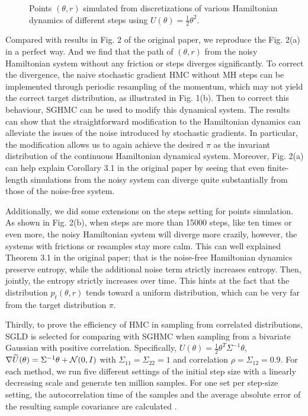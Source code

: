 \begin{figure}[htp] 
    \centering
    \hfill%
    \caption{Points $(\theta,r)$ simulated from discretizations of various Hamiltonian dynamics of different steps using $U(\theta) = \frac{1}{2}\theta^2$.}
\end{figure}



Compared with results in Fig. 2 of the original paper, we reproduce the Fig. 2(a) in a perfect way. And we find that the path of $(\theta,r)$ from the noisy Hamiltonian system without any friction or steps diverges significantly. To correct the divergence, the naive stochastic gradient HMC without MH steps can be implemented through periodic resampling of the momentum, which may not yield the correct target distribution, as illustrated in Fig. 1(b). Then to correct this behaviour, SGHMC can be used to modify this dynamical system. The results can show that the straightforward modification to the Hamiltonian dynamics can alleviate the issues of the noise introduced by stochastic gradients. In particular, the modification allows us to again achieve the desired $\pi$ as the invariant distribution of the continuous Hamiltonian dynamical system. Moreover, Fig. 2(a) can help explain Corollary 3.1 in the original paper by seeing that even finite-length simulations from the noisy system can diverge quite substantially from those of the noise-free system.

Additionally, we did some extensions on the steps setting for points simulation. As shown in Fig. 2(b), when steps are more than 15000 steps, like ten times or even more, the noisy Hamiltonian system will diverge more crazily, however, the systems with frictions or resamples stay more calm. This can well explained Theorem 3.1 in the original paper; that is the noise-free Hamiltonian dynamics preserve entropy, while the additional noise term strictly increases entropy. Then, jointly, the entropy strictly increases over time. This hints at the fact that the distribution $p_t(\theta,r)$ tends toward a uniform distribution, which can be very far from the target distribution $\pi$. 

Thirdly, to prove the efficiency of HMC in sampling from correlated distributions, SGLD \cite{sgld} is selected for comparing with SGHMC when sampling from a bivariate Gaussian with positive correlation. Specifically, $U(\theta)=\frac{1}{2}\theta^T\Sigma^{-1}\theta$, 
$\nabla \widetilde{U}(\theta) = \Sigma^{-1}\theta + \mathcal{N}(0,I)$ with $\Sigma_{11} = \Sigma_{22} = 1$ and correlation $\rho = \Sigma_{12} = 0.9$.  For each method, we run five different settings of the initial step size with a linearly decreasing scale and generate ten million samples. For one set per step-size setting, the autocorrelation time of the samples and the average absolute error of the resulting sample covariance are calculated . 


